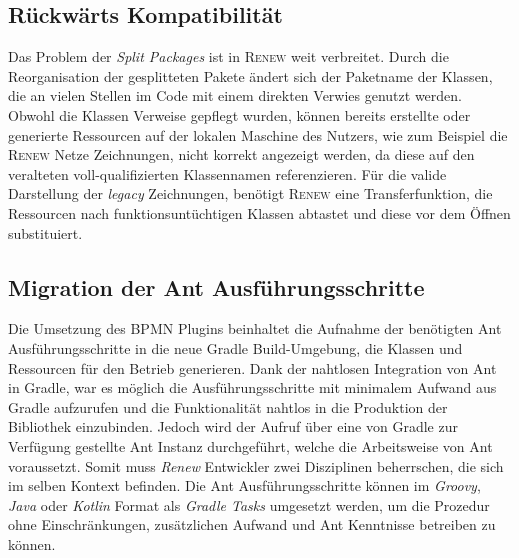  \subsection*{Rückwärts Kompatibilität}
	Das Problem der \textit{Split Packages} ist in \textsc{Renew} weit verbreitet. Durch die Reorganisation der gesplitteten Pakete ändert sich der Paketname der Klassen, die an vielen Stellen im Code mit einem direkten Verwies genutzt werden. Obwohl die Klassen Verweise gepflegt wurden, können bereits erstellte oder generierte Ressourcen auf der lokalen Maschine des Nutzers, wie zum Beispiel die \textsc{Renew} Netze Zeichnungen, nicht korrekt angezeigt werden, da diese auf den veralteten voll-qualifizierten Klassennamen referenzieren.\newline
	Für die valide Darstellung der \textit{legacy} Zeichnungen, benötigt \textsc{Renew} eine Transferfunktion, die Ressourcen nach funktionsuntüchtigen Klassen abtastet und diese vor dem Öffnen substituiert.
	
 \subsection*{Migration der Ant Ausführungsschritte}
	Die Umsetzung des BPMN Plugins beinhaltet die Aufnahme der benötigten Ant Ausführungsschritte in die neue Gradle Build-Umgebung, die Klassen und Ressourcen für den Betrieb generieren. Dank der nahtlosen Integration von Ant in Gradle, war es möglich die Ausführungsschritte mit minimalem Aufwand aus Gradle aufzurufen und die Funktionalität nahtlos in die Produktion der Bibliothek einzubinden. Jedoch wird der Aufruf über eine von Gradle zur Verfügung gestellte Ant Instanz durchgeführt, welche die Arbeitsweise von Ant voraussetzt. Somit muss \textit{Renew} Entwickler zwei Disziplinen beherrschen, die sich im selben Kontext befinden.\newline
	Die Ant Ausführungsschritte können im \textit{Groovy}, \textit{Java} oder \textit{Kotlin} Format als \textit{Gradle Tasks} umgesetzt werden, um die Prozedur ohne Einschränkungen, zusätzlichen Aufwand und Ant Kenntnisse betreiben zu können. 
	
